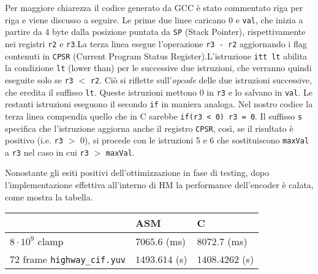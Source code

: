 \lstset{style=cstyle}
\begin{center}
  \begin{tabularx}{\textwidth}{ X | c }
  	\hline
    
    \xdef\tempwidth{\thelstlisting\linewidth} &
     \\
    \hline
  \end{tabularx}
\end{center}
Per maggiore chiarezza il codice generato da GCC è stato commentato riga per 
riga e viene discusso a seguire. \newline
Le prime due linee caricano 0 e \verb|val|, che inizia a partire da 4 byte dalla
 posizione puntata da \verb|SP| (Stack Pointer), rispettivamente nei registri
  \verb|r2| e \verb|r3|.\newline La terza linea esegue l'operazione
   \verb|r3 - r2| aggiornando i flag contenuti in \verb|CPSR| (Current Program 
Status Register).\newline L'istruzione \verb|itt lt| abilita la condizione 
\verb|lt| (lower than) per le successive due istruzioni, che verranno quindi 
eseguite solo se \verb|r3| $<$ \verb|r2|. Ciò si riflette sull'\emph{opcode}
delle due istruzioni successive, che eredita il suffisso \verb|lt|. Queste
istruzioni mettono 0 in \verb|r3| e lo salvano in \verb|val|. \newline
Le restanti istruzioni eseguono il secondo \verb|if| in maniera analoga.\newline
Nel nostro codice la terza linea compendia quello che in C sarebbe 
\verb|if(r3 < 0) r3 = 0|. Il suffisso \verb|s| specifica che l'istruzione 
aggiorna anche il 
registro \verb|CPSR|, così, se il risultato è positivo (i.e. \verb|r3| $>$ 0), 
si procede con le istruzioni 5 e 6 che sostituiscono \verb|maxVal| a \verb|r3| 
nel caso in cui \verb|r3| $>$ \verb|maxVal|.
\par Nonostante gli esiti positivi dell'ottimizzazione in fase di
testing, dopo l'implementazione effettiva all'interno di HM la performance 
dell'encoder è calata, come mostra la tabella.
\begin{center}
  \begin{tabular}{l | l | l}
    & ASM & C \\ \hline
    $8\cdot10^9$ clamp & $7065.6$ (ms) & $8072.7$ (ms) \\
    $72$ frame \verb|highway_cif.yuv| & $1493.614$ (s) &  $1408.4262$ (s) \\
  \end{tabular}
\end{center}
